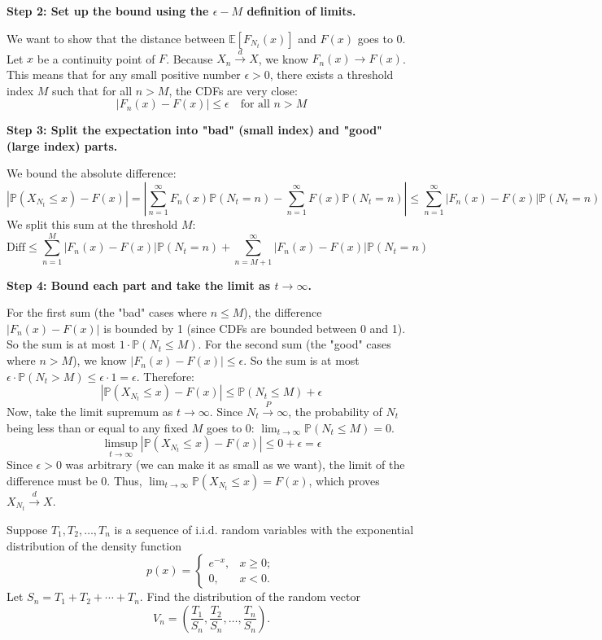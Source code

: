 \begin{solution}
\textbf{Step 2: Set up the bound using the $\epsilon-M$ definition of limits.}

We want to show that the distance between $\mathbb{E}[F_{N_t}(x)]$ and $F(x)$ goes to 0.
Let $x$ be a continuity point of $F$. Because $X_n \xrightarrow{d} X$, we know $F_n(x) \to F(x)$.
This means that for any small positive number $\epsilon > 0$, there exists a threshold index $M$ such that for all $n > M$, the CDFs are very close:
\[ |F_n(x) - F(x)| \leq \epsilon \quad \text{for all } n > M \]

\textbf{Step 3: Split the expectation into "bad" (small index) and "good" (large index) parts.}

We bound the absolute difference:
\[ |\mathbb{P}(X_{N_t} \leq x) - F(x)| = \left| \sum_{n=1}^\infty F_n(x) \mathbb{P}(N_t = n) - \sum_{n=1}^\infty F(x) \mathbb{P}(N_t = n) \right| \leq \sum_{n=1}^\infty |F_n(x) - F(x)| \mathbb{P}(N_t = n) \]
We split this sum at the threshold $M$:
\[ \text{Diff} \leq \sum_{n=1}^M |F_n(x) - F(x)| \mathbb{P}(N_t = n) + \sum_{n=M+1}^\infty |F_n(x) - F(x)| \mathbb{P}(N_t = n) \]

\textbf{Step 4: Bound each part and take the limit as $t \to \infty$.}

For the first sum (the "bad" cases where $n \leq M$), the difference $|F_n(x) - F(x)|$ is bounded by 1 (since CDFs are bounded between 0 and 1). So the sum is at most $1 \cdot \mathbb{P}(N_t \leq M)$.
For the second sum (the "good" cases where $n > M$), we know $|F_n(x) - F(x)| \leq \epsilon$. So the sum is at most $\epsilon \cdot \mathbb{P}(N_t > M) \leq \epsilon \cdot 1 = \epsilon$.
Therefore:
\[ |\mathbb{P}(X_{N_t} \leq x) - F(x)| \leq \mathbb{P}(N_t \leq M) + \epsilon \]
Now, take the limit supremum as $t \to \infty$. Since $N_t \xrightarrow{P} \infty$, the probability of $N_t$ being less than or equal to any fixed $M$ goes to 0: $\lim_{t \to \infty} \mathbb{P}(N_t \leq M) = 0$.
\[ \limsup_{t \to \infty} |\mathbb{P}(X_{N_t} \leq x) - F(x)| \leq 0 + \epsilon = \epsilon \]
Since $\epsilon > 0$ was arbitrary (we can make it as small as we want), the limit of the difference must be 0.
Thus, $\lim_{t \to \infty} \mathbb{P}(X_{N_t} \leq x) = F(x)$, which proves $X_{N_t} \xrightarrow{d} X$.
\end{solution}

\begin{exercise}\label{probability:2015:8}
Suppose $T_1, T_2, \dots, T_n$ is a sequence of i.i.d. random variables with the exponential distribution of the density function
\[
p(x) = \begin{cases} e^{-x}, & x \geq 0; \\ 0, & x < 0. \end{cases}
\]
Let $S_n = T_1 + T_2 + \cdots + T_n$. Find the distribution of the random vector
\[
V_n = \left(\frac{T_1}{S_n}, \frac{T_2}{S_n}, \dots, \frac{T_n}{S_n}\right).
\]
\end{exercise}

